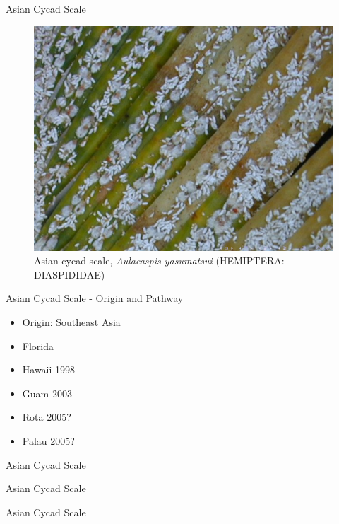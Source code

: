 \documentclass[]{beamer}
\begin{document}
\begin{frame}{Asian Cycad Scale}
	\begin{figure}
		\includegraphics[height=0.7\textheight]{asian-cycad-scale/output-07.png}
		\caption{Asian cycad scale, \textit{Aulacaspis yasumatsui} (HEMIPTERA: DIASPIDIDAE)}
	\end{figure}
\end{frame}

\begin{frame}{Asian Cycad Scale - Origin and Pathway}
	\begin{itemize}
		\item Origin: Southeast Asia
		\item Florida
		\item Hawaii 1998
		\item Guam 2003
		\item Rota 2005?
		\item Palau 2005?
	\end{itemize}
\end{frame}

\begin{frame}{Asian Cycad Scale}
\end{frame}

\begin{frame}{Asian Cycad Scale}
\end{frame}

\begin{frame}{Asian Cycad Scale}
\end{frame}
\end{document}

